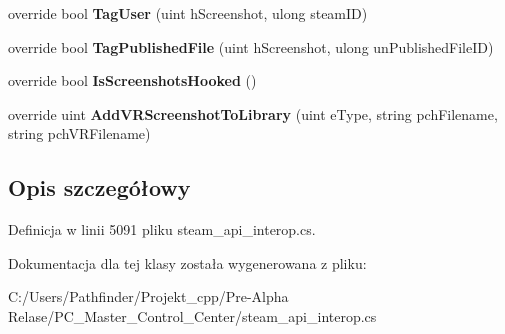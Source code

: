 \begin{DoxyCompactItemize}
override bool {\bfseries Tag\+User} (uint h\+Screenshot, ulong steam\+ID)
\item 
\mbox{\label{class_valve_1_1_steamworks_1_1_c_steam_screenshots_a0edd9e62c0ddf8cc6c46d845fa3e8156}} 
override bool {\bfseries Tag\+Published\+File} (uint h\+Screenshot, ulong un\+Published\+File\+ID)
\item 
\mbox{\label{class_valve_1_1_steamworks_1_1_c_steam_screenshots_a031f044b2f092773ed22b524eb9797f5}} 
override bool {\bfseries Is\+Screenshots\+Hooked} ()
\item 
\mbox{\label{class_valve_1_1_steamworks_1_1_c_steam_screenshots_ab28a9e51b9268357a1db21b226cd70cd}} 
override uint {\bfseries Add\+V\+R\+Screenshot\+To\+Library} (uint e\+Type, string pch\+Filename, string pch\+V\+R\+Filename)
\end{DoxyCompactItemize}


\subsection{Opis szczegółowy}


Definicja w linii 5091 pliku steam\+\_\+api\+\_\+interop.\+cs.



Dokumentacja dla tej klasy została wygenerowana z pliku\+:\begin{DoxyCompactItemize}
\item 
C\+:/\+Users/\+Pathfinder/\+Projekt\+\_\+cpp/\+Pre-\/\+Alpha Relase/\+P\+C\+\_\+\+Master\+\_\+\+Control\+\_\+\+Center/steam\+\_\+api\+\_\+interop.\+cs\end{DoxyCompactItemize}
